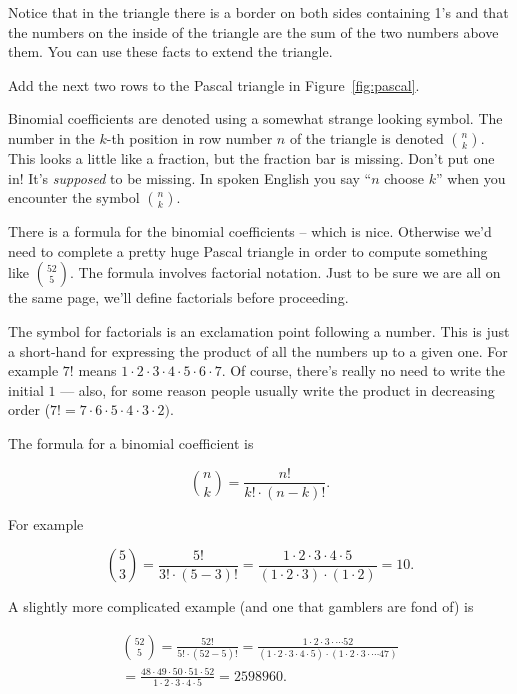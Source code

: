 Notice that in the triangle there is a border on both sides containing
1's and that the numbers on the inside of the triangle are the sum of the
two numbers above them.  You can use these facts to extend the triangle.

\begin{exer}
Add the next two rows to the Pascal triangle in Figure~\ref{fig:pascal}.
\end{exer}

Binomial coefficients are denoted using a somewhat strange looking
symbol.  The number in the $k$-th position in row number $n$ of
the triangle is denoted $\displaystyle \binom{n}{k}$.  This looks 
a little like a fraction, but the fraction bar is missing.  Don't
put one in!  It's \emph{supposed} to be missing.  In spoken English
you say ``$n$ choose $k$'' when you encounter the symbol $\displaystyle \binom{n}{k}$. 

There is a formula for the binomial coefficients -- which is nice.  Otherwise
we'd need to complete a pretty huge Pascal triangle in order to compute
something like $\displaystyle \binom{52}{5}$.  The formula involves 
 factorial notation.  Just to be sure we are 
all on the same page, we'll define factorials before proceeding.

The symbol for factorials is an exclamation point following a number.
This is just a short-hand for expressing the
product of all the numbers up to a given one.
For example $7!$ means $1\cdot 2\cdot 3\cdot 4\cdot 5\cdot 6\cdot 7$.
Of course, there's really no need to write the initial $1$ --- also,
for some reason people usually write the product in decreasing order
($7! = 7 \cdot 6 \cdot 5 \cdot 4 \cdot 3 \cdot 2)$.

The formula for a binomial coefficient is 

\[ \binom{n}{k} = \frac{n!}{k! \cdot (n-k)!}. \]

For example

\[ \binom{5}{3} = \frac{5!}{3! \cdot (5-3)!} = \frac{1\cdot 2\cdot 3\cdot 4\cdot 5}{(1\cdot 2\cdot 3) \cdot (1\cdot 2)} = 10. \]

A slightly more complicated example (and one that gamblers are fond of) 
is

\begin{gather*} 
\binom{52}{5} = \frac{52!}{5! \cdot (52-5)!} 
 = \frac{1\cdot 2\cdot 3\cdot \cdots 52}{(1\cdot 2\cdot 3 \cdot 4 \cdot 5) \cdot (1\cdot 2 \cdot 3\cdot \cdots 47)}\\
 = \frac{48 \cdot 49 \cdot 50 \cdot 51 \cdot 52}{1\cdot 2\cdot 3 \cdot 4 \cdot 5} = 2598960.
\end{gather*}

